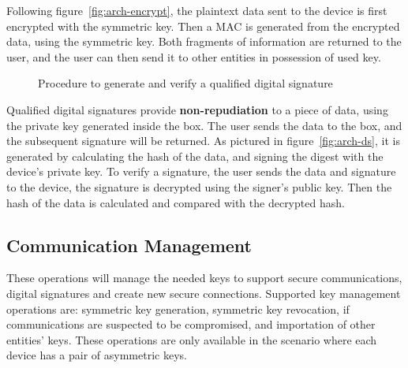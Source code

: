 Following figure~\ref{fig:arch-encrypt}, the plaintext data sent to the device is first encrypted with the symmetric key. Then a \ac{MAC} is generated from the encrypted data, using the symmetric key. Both fragments of information are returned to the user, and the user can then send it to other entities in possession of used key.

\begin{figure}
	\centering     %
	\caption{Procedure to generate and verify a qualified digital signature}
\end{figure}

Qualified digital signatures provide \textbf{non-repudiation} to a piece of data, using the private key generated inside the box. The user sends the data to the box, and the subsequent signature will be returned. As pictured in figure~\ref{fig:arch-ds}, it is generated by calculating the hash of the data, and signing the digest with the device's private key. To verify a signature, the user sends the data and signature to the device, the signature is decrypted using the signer's public key. Then the hash of the data is calculated and compared with the decrypted hash.

\subsection{Communication Management}\label{chap:arch:ops:key}

These operations will manage the needed keys to support secure communications, digital signatures and create new secure connections.
Supported key management operations are: symmetric key generation, symmetric key revocation, if communications are suspected to be compromised, and importation of other entities' keys.
These operations are only available in the scenario where each device has a pair of asymmetric keys.

